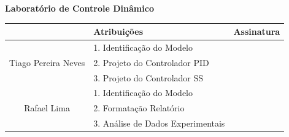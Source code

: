 \documentclass[a4paper,11pt]{article}
\begin{document}



\nocite{ogata2010modern}


\newpage

\begin{center}
    \huge \textbf{Laboratório de Controle Dinâmico \\}
\end{center}

\begin{table}[H]
    \centering
    \begin{tabular}{|c|p{6cm}|c|}
    \hline
         & Atribuições & Assinatura \\
    \hline
                        & 1. Identificação do Modelo & \\
    Tiago Pereira Neves & 2. Projeto do Controlador PID & \\
                        & 3. Projeto do Controlador SS & \\
    \hline

                & 1. Identificação do Modelo &\\
    Rafael Lima & 2. Formatação Relatório &\\
                & 3. Análise de Dados Experimentais& \\
     \hline
    \end{tabular}
\end{table}

\thispagestyle{empty}

\end{document}
